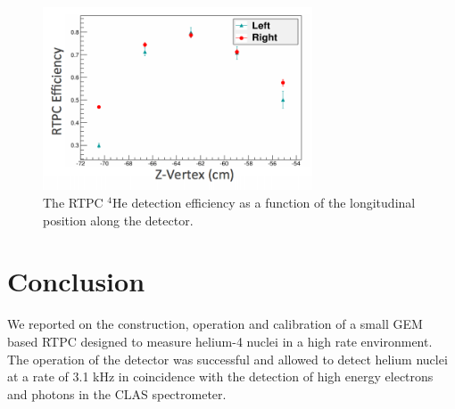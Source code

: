 \documentclass[twocolumn,showpacs,superscriptaddress,groupedaddress]{revtex4}
\begin{document}
\begin{figure}[tb]
\centering
\includegraphics[width=8cm]{fig/tpceff.png}
\caption{The RTPC $^4$He detection efficiency as a function of the longitudinal 
   position along the detector.
 \label{fig:rtpc_eff}}
 \end{figure}


\section{Conclusion}

We reported on the construction, operation and calibration of a small GEM based RTPC 
designed to measure helium-4 nuclei in a high rate environment. The operation
of the detector was successful and allowed to detect helium nuclei at a rate
of 3.1 kHz in coincidence with the detection of high energy electrons and 
photons in the CLAS spectrometer. 

  
\end{document}
